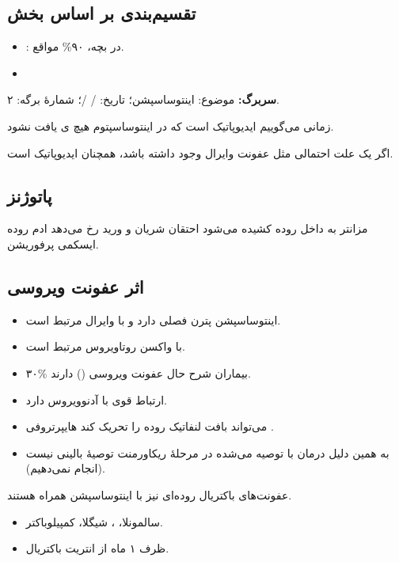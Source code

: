\documentclass[12pt,a4paper]{article}
\begin{document}
\subsection*{تقسیم‌بندی بر اساس بخش}
\begin{itemize}
\item {}: در بچه، ۹۰\% مواقع.
\item {}
\end{itemize}

\textbf{سربرگ:} موضوع: اینتوساسپشن؛ تاریخ: / /؛ شمارهٔ برگه: ۲.

زمانی می‌گوییم ایدیوپاتیک است که در اینتوساسپتوم هیچ ی یافت نشود.

اگر یک علت احتمالی مثل عفونت وایرال وجود داشته باشد، همچنان ایدیوپاتیک است.

\subsection*{پاتوژنز}
مزانتر به داخل روده کشیده می‌شود
\IntussusceptionArrow احتقان شریان و ورید رخ می‌دهد
\IntussusceptionArrow ادم روده
\IntussusceptionArrow ایسکمی
\IntussusceptionArrow پرفوریشن.

\subsection*{اثر عفونت ویروسی}
\begin{itemize}
\item اینتوساسپشن پترن فصلی دارد و با  وایرال مرتبط است.
\item با واکسن روتاویروس مرتبط است.
\item ۳۰\% بیماران شرح حال عفونت ویروسی () دارند.
\item ارتباط قوی با آدنوویروس دارد.
\item می‌تواند بافت لنفاتیک روده را تحریک کند
\IntussusceptionArrow هایپرتروفی .
\item به همین دلیل درمان با  توصیه می‌شده در مرحلهٔ ریکاورمنت
\IntussusceptionArrow توصیهٔ بالینی نیست (انجام نمی‌دهیم).
\end{itemize}

عفونت‌های باکتریال روده‌ای نیز با اینتوساسپشن همراه هستند.
\begin{itemize}
\item سالمونلا، ، شیگلا، کمپیلوباکتر.
\item ظرف ۱ ماه از انتریت باکتریال.
\end{itemize}
\end{document}
